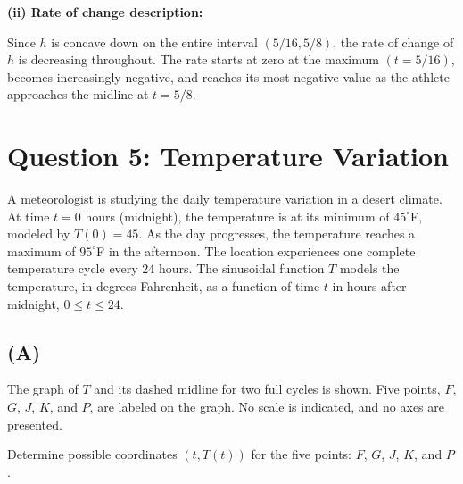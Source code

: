 \documentclass[11pt]{article}
\begin{document}
\vspace{0.5cm}
\textbf{(ii) Rate of change description:}

Since $h$ is concave down on the entire interval $(5/16, 5/8)$, the rate of change of $h$ is decreasing throughout. The rate starts at zero at the maximum $(t = 5/16)$, becomes increasingly negative, and reaches its most negative value as the athlete approaches the midline at $t = 5/8$.

\newpage

\section*{Question 5: Temperature Variation}

A meteorologist is studying the daily temperature variation in a desert climate. At time $t = 0$ hours (midnight), the temperature is at its minimum of $45^\circ$F, modeled by $T(0) = 45$. As the day progresses, the temperature reaches a maximum of $95^\circ$F in the afternoon. The location experiences one complete temperature cycle every 24 hours. The sinusoidal function $T$ models the temperature, in degrees Fahrenheit, as a function of time $t$ in hours after midnight, $0 \leq t \leq 24$.

\subsection*{(A)}
The graph of $T$ and its dashed midline for two full cycles is shown. Five points, $F$, $G$, $J$, $K$, and $P$, are labeled on the graph. No scale is indicated, and no axes are presented.

Determine possible coordinates $(t, T(t))$ for the five points: $F$, $G$, $J$, $K$, and $P$.

\begin{center}
\end{center}
\end{document}
